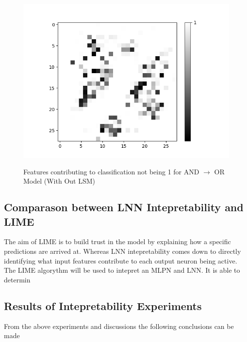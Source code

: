 \begin{figure}[H]
\begin{minipage}[t]{0.5\textwidth}
	\begin{minipage}[b]{0.5\textwidth}
		\captionsetup{labelformat=empty}
		\includegraphics[width=\textwidth]{AND-OR(W-LSM)(1)/Like/False/Layer0-Neuron-9.png}
		\label{}
	\end{minipage}
	\caption{Features contributing to classification not being 1 for AND $\rightarrow$ OR Model (With Out LSM)}
	\end{minipage}
	\hfill
\end{figure}

\subsection{Comparason between LNN Intepretability and LIME}
The aim of LIME is to build trust in the model by explaining how a specific predictions are arrived at.  Whereas LNN intepretability comes down to directly identifying what input features contribute to each output neuron being active. The LIME algorythm will be used to intepret an MLPN and LNN. It is able to determin 


\subsection{Results of Intepretability Experiments}
From the above experiments and discussions the following conclusions can be made

